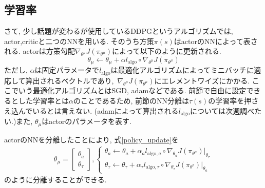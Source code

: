 \documentclass{jsarticle}
\begin{document}
\subsection{学習率}
さて, 少し話題が変わるが使用しているDDPGというアルゴリズムでは, actor,criticと二つのNNを用いる. そのうち方策$\pi(s)$はactorのNNによって表される. actorは方策勾配$\nabla_{\theta^{\mu}}J(\pi_{\theta^{\mu}})$によって以下のように更新される.
\begin{equation}
	\theta_{\mu} \gets \theta_{\mu}+ \alpha l_{\textrm{algo}}\circ\nabla_{\theta^{\mu}}J(\pi_{\theta^{\mu}}) \label{policy_update}
\end{equation}
ただし, $\alpha$は固定パラメータで$l_{\textrm{algo}}$は最適化アルゴリズムによってミニバッチに適応して算出されるベクトルであり,~$\nabla_{\theta^{\mu}}J(\pi_{\theta^{\mu}})$にエレメントワイズにかかる. ここでいう最適化アルゴリズムとはSGD, adamなどである. 前節で自由に設定できるとした学習率とは$\alpha$のことであるため, 前節のNN分離は$\tau(s)$の学習率を押さえ込んでいるとは言えない. (adamによって算出される$l_{\textrm{algo}}$については次週調べたい.)また, $\theta_{\mu}$はactorのパラメータを表す.\par
actorのNNを分離したことにより, 式\eqref{policy_update}を
\begin{align}
\theta_{\mu} = \begin{bmatrix}\theta_a \\ \theta_{\tau}\end{bmatrix}, 
\begin{cases}
	\theta_a \gets \theta_a+ \alpha_a l_{\textrm{algo},a}\circ\nabla_{\theta_a}J(\pi_{\theta^{\mu}})|_{\theta_{\tau}} \\
	\theta_{\tau} \gets \theta_{\tau}+ \alpha_{\tau} l_{\textrm{algo},\tau}\circ\nabla_{\theta_{\tau}}J(\pi_{\theta^{\tau}})|_{\theta_a}
\end{cases}
\end{align}
のように分離することができる.
\end{document}
